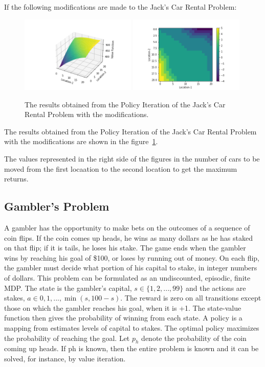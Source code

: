 If the following modifications are made to the Jack's Car Rental Problem:

\begin{figure}[h!]
    \centering
    \includegraphics[width=0.49\textwidth]{images/jack-2-3d.png}
    \includegraphics[width=0.49\textwidth]{images/jack-2-pi.png}
    \caption{The results obtained from the Policy Iteration of the Jack's Car Rental Problem with the modifications.}
    \label{fig:jack-car-rental-modified}
\end{figure}

The results obtained from the Policy Iteration of the Jack's Car Rental Problem with the modifications are shown in the figure~\ref{fig:jack-car-rental-modified}.

The values represented in the right side of the figures in the number of cars to be moved from the first locaation to the second location to get the maximum returns.

\subsection{Gambler's Problem}

A gambler has the opportunity to make bets on the outcomes of a sequence of coin flips. If the coin comes up heads, he wins as many dollars as he has staked on that flip; if it is tails, he loses his stake. The game ends when the gambler wins by reaching his goal of \$100, or loses by running out of money. On each flip, the gambler must decide what portion of his capital to stake, in integer numbers of dollars. This problem can be formulated as an undiscounted, episodic, finite MDP. The state is the gambler's capital, $s \in \{1, 2, . . . , 99\}$ and the actions are stakes, $a \in {0, 1, . . . , \min(s, 100-s)}$. The reward is zero on all transitions except those on which the gambler reaches his goal, when it is +1. The state-value function then gives the probability of winning from each state. A policy is a mapping from estimates levels of capital to stakes. The optimal policy maximizes the probability of reaching the goal. Let $p_h$ denote the probability of the coin coming up heads. If ph is known, then the entire problem is known and it can be solved, for instance, by value iteration.

